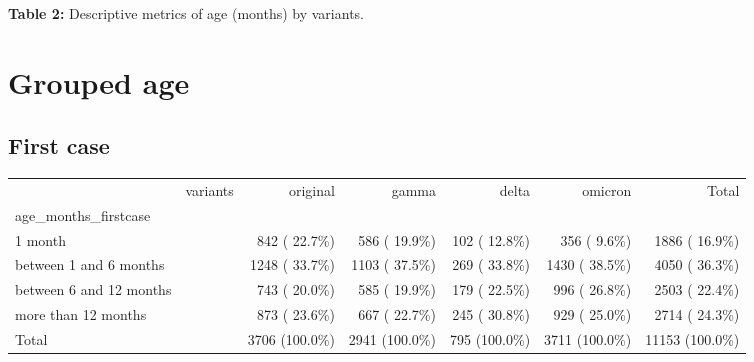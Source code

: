 \documentclass[
]{article}
\newenvironment{Shaded}{\begin{snugshade}}{\end{snugshade}}
\newcommand{\AttributeTok}[1]{\textcolor[rgb]{0.77,0.63,0.00}{#1}}
\newcommand{\ConstantTok}[1]{\textcolor[rgb]{0.00,0.00,0.00}{#1}}
\newcommand{\DocumentationTok}[1]{\textcolor[rgb]{0.56,0.35,0.01}{\textbf{\textit{#1}}}}
\newcommand{\FunctionTok}[1]{\textcolor[rgb]{0.00,0.00,0.00}{#1}}
\newcommand{\NormalTok}[1]{#1}
\newcommand{\OtherTok}[1]{\textcolor[rgb]{0.56,0.35,0.01}{#1}}
\newcommand{\SpecialCharTok}[1]{\textcolor[rgb]{0.00,0.00,0.00}{#1}}
\newcommand{\StringTok}[1]{\textcolor[rgb]{0.31,0.60,0.02}{#1}}
\renewenvironment{Shaded}{\begin{mdframed}[ backgroundcolor=shadecolor, linecolor = shadecolor, leftmargin=\dimexpr\leftmargin-2pt\relax, innerleftmargin=1.6pt, innertopmargin=5pt, skipabove=10pt,skipbelow=3pt ]}{\end{mdframed}}
\begin{document}
\textbf{Table 2:} Descriptive metrics of age (months) by variants.

\newpage

\hypertarget{grouped-age}{%
\section{Grouped age}\label{grouped-age}}

\hypertarget{first-case}{%
\subsection{First case}\label{first-case}}

\begin{Shaded}
\end{Shaded}

\begin{longtable}[]{@{}lrrrrrr@{}}
\toprule()
\endhead
& variants & original & gamma & delta & omicron & Total \\
age\_months\_firstcase & & & & & & \\
1 month & & 842 ( 22.7\%) & 586 ( 19.9\%) & 102 ( 12.8\%) & 356 ( 9.6\%)
& 1886 ( 16.9\%) \\
between 1 and 6 months & & 1248 ( 33.7\%) & 1103 ( 37.5\%) & 269 (
33.8\%) & 1430 ( 38.5\%) & 4050 ( 36.3\%) \\
between 6 and 12 months & & 743 ( 20.0\%) & 585 ( 19.9\%) & 179 (
22.5\%) & 996 ( 26.8\%) & 2503 ( 22.4\%) \\
more than 12 months & & 873 ( 23.6\%) & 667 ( 22.7\%) & 245 ( 30.8\%) &
929 ( 25.0\%) & 2714 ( 24.3\%) \\
Total & & 3706 (100.0\%) & 2941 (100.0\%) & 795 (100.0\%) & 3711
(100.0\%) & 11153 (100.0\%) \\
\bottomrule()
\end{longtable}
\end{document}
